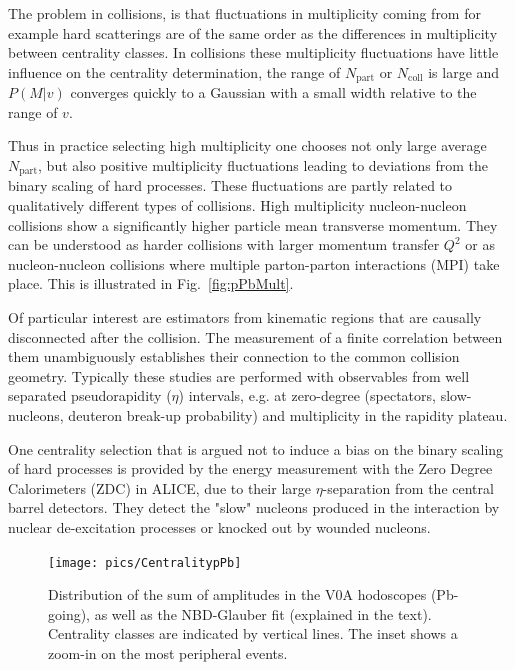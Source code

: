 
The problem in \pPb collisions, is that fluctuations in multiplicity coming from for example hard scatterings are of the same order as the differences in multiplicity between centrality classes. In \PbPb collisions these multiplicity fluctuations have little influence on the centrality determination, the range of $N_\mathrm{part}$ or $N_\mathrm{coll}$ is large and $P\left(M|v\right)$ converges quickly to a Gaussian with a small width relative to the range of $v$. 

Thus in practice selecting high multiplicity one chooses not only large average $N_\mathrm{part}$, but also positive multiplicity fluctuations leading to deviations from the binary scaling of hard processes. These fluctuations are partly related to qualitatively different types of collisions. High multiplicity nucleon-nucleon collisions show a significantly higher particle mean transverse momentum. They can be understood as harder collisions with larger momentum transfer $Q^2$ or as nucleon-nucleon collisions where multiple parton-parton interactions (MPI) take place. This is illustrated in Fig.~\ref{fig:pPbMult}.

Of particular interest are estimators from kinematic regions that are causally disconnected after the collision. The measurement of a finite correlation between them unambiguously establishes their connection to the common collision geometry. Typically these studies are performed with observables from well separated pseudorapidity ($\eta$) intervals, e.g. at zero-degree (spectators, slow-nucleons, deuteron break-up probability) and multiplicity in the rapidity plateau.

One centrality selection that is argued not to induce a bias on the binary scaling of hard processes is provided by the energy measurement with the Zero Degree Calorimeters (ZDC) in ALICE, due to their large $\eta$-separation from the central barrel detectors. They detect the "slow" nucleons produced in the interaction by nuclear de-excitation processes or knocked out by wounded nucleons.

\begin{figure}[b!]
\centering
            	\texttt{[image: pics/CentralitypPb]}
                \caption{Distribution of the sum of amplitudes in the V0A hodoscopes (Pb-going), as well
as the NBD-Glauber fit (explained in the text). Centrality classes are indicated by vertical lines. The
inset shows a zoom-in on the most peripheral events.~\cite{Adam:2014qja}}
	\label{fig:pPbcentrality}
\end{figure}



